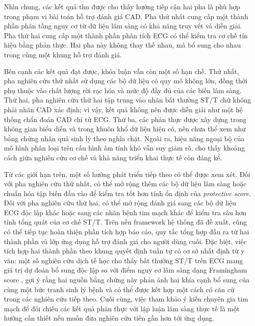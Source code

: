 \blocksep

Nhìn chung, các kết quả thu được cho thấy hướng tiếp cận hai pha là phù hợp trong phạm vi bài toán hỗ trợ đánh giá CAD. Pha thứ nhất cung cấp một thành phần phân tầng nguy cơ từ dữ liệu lâm sàng có khả năng truy vết và diễn giải. Pha thứ hai cung cấp một thành phần phân tích ECG có thể kiểm tra cơ chế tín hiệu bằng phản thực. Hai pha này không thay thế nhau, mà bổ sung cho nhau trong cùng một khung hỗ trợ đánh giá.

\blocksep

Bên cạnh các kết quả đạt được, khóa luận vẫn còn một số hạn chế. Thứ nhất, pha nghiên cứu thứ nhất sử dụng các bộ dữ liệu có quy mô không lớn, đồng thời phụ thuộc vào chất lượng rời rạc hóa và mức độ đầy đủ của các biến lâm sàng. Thứ hai, pha nghiên cứu thứ hai tập trung vào nhãn bất thường ST/T chứ không phải nhãn CAD xác định; vì vậy, kết quả không nên được diễn giải như một hệ thống chẩn đoán CAD chỉ từ ECG. Thứ ba, các phản thực được xây dựng trong không gian biểu diễn và trong khuôn khổ dữ liệu hiện có, nên chưa thể xem như bằng chứng nhân quả sinh lý theo nghĩa chặt. Ngoài ra, hiệu năng ngoại bộ của mô hình phân loại trên cấu hình âm tính khó vẫn suy giảm rõ, cho thấy khoảng cách giữa nghiên cứu cơ chế và khả năng triển khai thực tế còn đáng kể.

\blocksep

Từ các giới hạn trên, một số hướng phát triển tiếp theo có thể được xem xét. Đối với pha nghiên cứu thứ nhất, có thể mở rộng thêm các bộ dữ liệu lâm sàng hoặc chuẩn hóa tập biến đầu vào để kiểm tra tốt hơn tính ổn định của \textit{protective score}. Đối với pha nghiên cứu thứ hai, có thể mở rộng đánh giá sang các bộ dữ liệu ECG độc lập khác hoặc sang các nhãn bệnh tim mạch khác để kiểm tra sâu hơn tính tổng quát của cơ chế ST/T. Trên nền framework hệ thống đã đề xuất, cũng có thể tiếp tục hoàn thiện phần tích hợp báo cáo, quy tắc tổng hợp đầu ra từ hai thành phần và lớp ứng dụng hỗ trợ đánh giá cho người dùng cuối. Đặc biệt, việc tích hợp hai thành phần theo khung quyết định tuần tự có cơ sở nhất định từ y văn: một số nghiên cứu dịch tễ học cho thấy bất thường ST/T trên ECG mang giá trị dự đoán bổ sung độc lập so với điểm nguy cơ lâm sàng dạng Framingham score \cite{StromMoller2007, Badheka2013, Muccini2021}, gợi ý rằng hai nguồn bằng chứng này phản ánh hai khía cạnh bổ sung của cùng một bức tranh sinh lý bệnh và có thể được kết hợp một cách có căn cứ trong các nghiên cứu tiếp theo. Cuối cùng, việc tham khảo ý kiến chuyên gia tim mạch để đối chiếu các kết quả phản thực với lập luận lâm sàng thực tế là một hướng cần thiết nếu muốn đưa nghiên cứu tiến gần hơn tới ứng dụng.

